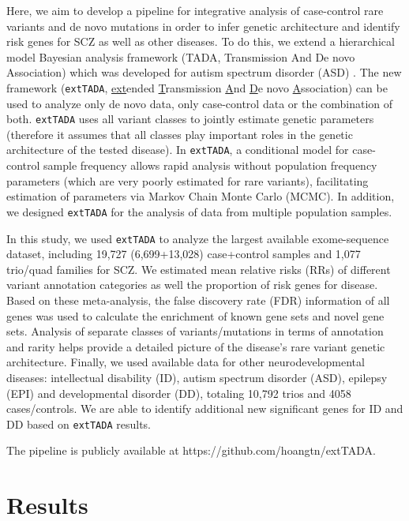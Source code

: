 \documentclass[]{article}
\begin{document}
Here, we aim to develop a pipeline for integrative analysis of case-control
rare variants and de novo mutations in order to infer genetic
architecture and identify risk genes
for SCZ as well as other diseases. To do this, we extend a hierarchical model Bayesian analysis framework
(TADA, Transmission And De novo Association) which was developed for
autism spectrum disorder (ASD) \citep{he2013integrated}. The new
framework (\texttt{extTADA}, \underline{ext}ended \underline{T}ransmission \underline{A}nd \underline{D}e novo \underline{A}ssociation) can
be used to analyze only de novo data, only case-control data or the
combination of both.
\texttt{extTADA} uses all variant classes to
jointly estimate genetic parameters (therefore it assumes that all classes play important roles in the genetic architecture of the tested disease). In \texttt{extTADA}, a conditional
model for case-control sample frequency allows rapid analysis without population frequency parameters (which are very poorly estimated for rare variants), facilitating estimation of
parameters via Markov Chain Monte Carlo
(MCMC). In addition, we designed \texttt{extTADA} for the analysis of data from multiple population samples.


In this study, we used \texttt{extTADA} to analyze the largest available exome-sequence dataset, including
19,727 (6,699+13,028) case+control samples and 1,077 trio/quad families for SCZ. We estimated mean relative risks (RRs) of different variant annotation categories as
well the proportion of risk genes for disease. Based on these meta-analysis, the false discovery rate (FDR) information of all genes was used to calculate the enrichment of known gene sets and novel gene sets. Analysis of separate classes of variants/mutations in terms of annotation and rarity helps provide a detailed picture of the disease's rare variant genetic architecture.
Finally, we used available data for other neurodevelopmental diseases: intellectual
disability (ID), autism spectrum disorder (ASD), epilepsy (EPI) and
developmental disorder (DD), totaling 10,792 trios
and 4058 cases/controls. We are able to identify additional new
significant genes for ID and DD based on \texttt{extTADA} results.

The pipeline is publicly available at https://github.com/hoangtn/extTADA.


\section{Results}
\end{document}
